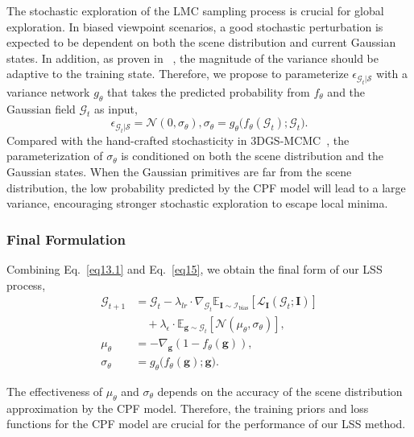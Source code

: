 \documentclass[lettersize,journal]{IEEEtran}
\begin{document}
The stochastic exploration of the LMC sampling process is crucial for global exploration. In biased viewpoint scenarios, a good stochastic perturbation is expected to be dependent on both the scene distribution and current Gaussian states. 
In addition, as proven in ~\cite{sgld2}, the magnitude of the variance should be adaptive to the training state. Therefore, we propose to parameterize $\epsilon_{\mathcal{G}_t \vert \mathcal{S}}$ with a variance network $g_{\theta}$ that takes the predicted probability from $f_{\theta}$ and the Gaussian field $\mathcal{G}_t$ as input,
\begin{equation}
    \epsilon_{\mathcal{G}_t \vert \mathcal{S}} = \mathcal{N} (0, \sigma_{\theta}), \sigma_{\theta} = g_{\theta}\big(f_{\theta}(\mathcal{G}_t); \mathcal{G}_t\big).
    \label{eq15}
\end{equation}
Compared with the hand-crafted stochasticity in 3DGS-MCMC~\cite{mcmc}, the parameterization of $\sigma_{\theta}$ is conditioned on both the scene distribution and the Gaussian states. When the Gaussian primitives are far from the scene distribution, the low probability predicted by the CPF model will lead to a large variance, encouraging stronger stochastic exploration to escape local minima. 

\subsubsection{Final Formulation}

Combining Eq.~\ref{eq13.1} and Eq.~\ref{eq15}, we obtain the final form of our LSS process, 
\begin{align}
    \mathcal{G}_{t+1} &= \mathcal{G}_t - \lambda_{lr} \cdot \nabla_{\mathcal{G}_t} \mathbb{E}_{\mathbf{I} \sim \mathcal{I}_{\text{bias}}} \left[ \mathcal{L}_{\mathbf{I}} \left( \mathcal{G}_t; \mathbf{I}\right) \right] \nonumber\\
        &\quad + \lambda_{\epsilon} \cdot \mathbb{E}_{\mathbf{g} \sim \mathcal{G}_t} \left[ \mathcal{N}(\mu_{\theta}, \sigma_{\theta}) \right], \label{eq16}\\
    \mu_{\theta} &= -  \nabla_{\mathbf{g}}  \left( 1 -  f_{\theta}( \mathbf{g} ) \right), \label{eq17}\\
    \sigma_{\theta} &= g_{\theta}\big(f_{\theta}(\mathbf{g}); \mathbf{g}\big). \label{eq18}
\end{align}

The effectiveness of $\mu_{\theta}$ and $\sigma_{\theta}$ depends on the accuracy of the scene distribution approximation by the CPF model. Therefore, the training priors and loss functions for the CPF model are crucial for the performance of our LSS method.
\end{document}
